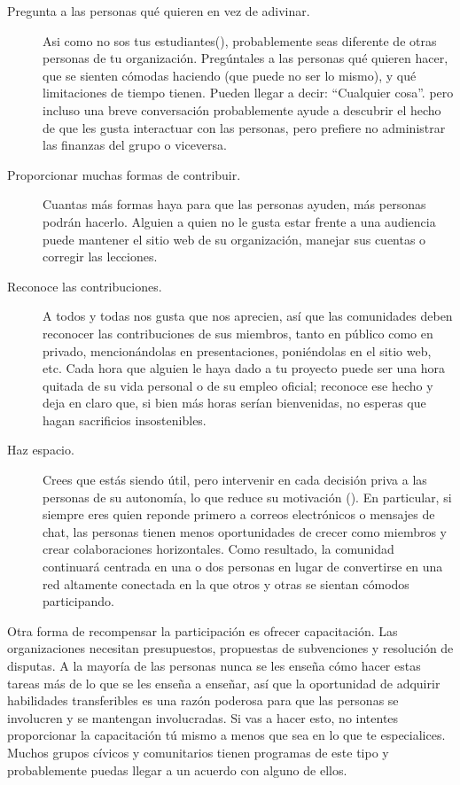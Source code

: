 \begin{description}

\item[Pregunta a las personas qué quieren en vez de adivinar.]
  Asi como no sos tus estudiantes(),
  probablemente seas diferente de otras personas de tu organización.
  Pregúntales a las personas qué quieren hacer,
  que se sienten cómodas haciendo (que puede no ser lo mismo),
  y qué limitaciones de tiempo tienen.
  Pueden llegar a decir: ``Cualquier cosa''.
  pero incluso una breve conversación probablemente ayude a descubrir el hecho de que
  les gusta interactuar con las personas, pero prefiere no administrar las finanzas del grupo
  o viceversa.

\item[Proporcionar muchas formas de contribuir.]
    Cuantas más formas haya para que las personas ayuden, más personas podrán hacerlo.
  Alguien a quien no le gusta estar frente a una audiencia 
  puede mantener el sitio web de su organización, 
  manejar sus cuentas 
  o corregir las lecciones.

\item[Reconoce las contribuciones.]
  A todos y todas nos gusta que nos aprecien, 
  así que las comunidades deben reconocer las contribuciones 
  de sus miembros, tanto en público como en privado, 
  mencionándolas en presentaciones, 
  poniéndolas en el sitio web, etc.
  Cada hora que alguien le haya dado a tu proyecto 
  puede ser una hora quitada de su vida personal o de su empleo oficial; 
  reconoce ese hecho 
  y deja en claro que, si bien más horas serían bienvenidas, 
  no esperas que hagan sacrificios insostenibles.

\item[Haz espacio.]
  Crees que estás siendo útil, 
  pero intervenir en cada decisión priva a las personas de su autonomía, 
  lo que reduce su motivación ().
  En particular, si siempre eres quien reponde primero a correos electrónicos o mensajes de chat, 
  las personas tienen menos oportunidades de crecer como miembros 
  y crear colaboraciones horizontales.
  Como resultado, 
  la comunidad continuará centrada en una o dos personas 
  en lugar de convertirse en una red altamente conectada 
  en la que otros y otras se sientan cómodos participando.

\end{description}

Otra forma de recompensar la participación es ofrecer capacitación.
Las organizaciones necesitan presupuestos, propuestas de subvenciones y resolución de disputas.
A la mayoría de las personas nunca se les enseña cómo hacer estas tareas más de lo que se les enseña a enseñar,
así que la oportunidad de adquirir habilidades transferibles 
es una razón poderosa para que las personas se involucren y se mantengan involucradas.
Si vas a hacer esto, no intentes proporcionar la capacitación tú mismo
a menos que sea en lo que te especialices.
Muchos grupos cívicos y comunitarios tienen programas de este tipo
y probablemente puedas llegar a un acuerdo con alguno de ellos.


